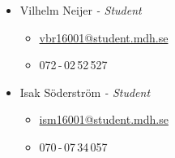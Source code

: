 \begin{itemize}
        \item Vilhelm Neijer \textit{- Student}
            \begin{itemize}
                \item \href{mailto:vbr16001@student.mdh.se}{vbr16001@student.mdh.se}
                \item 072\,-\,02\,52\,527
            \end{itemize}

        \item Isak Söderström \textit{- Student}
            \begin{itemize}
                \item \href{mailto:ism16001@student.mdh.se}{ism16001@student.mdh.se}
                \item 070\,-\,07\,34\,057
            \end{itemize}
\end{itemize}






